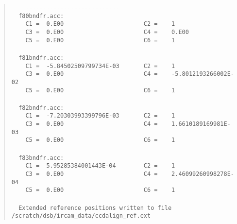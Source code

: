 \begin{quote}
\begin{tabbing}
\verb#    ---------------------------#\\
\verb#  f80bndfr.acc:#\\
\verb#    C1 =  0.E00                       C2 =    1#\\
\verb#    C3 =  0.E00                       C4 =    0.E00#\\
\verb#    C5 =  0.E00                       C6 =    1#\\
\verb##\\
\verb#  f81bndfr.acc:#\\
\verb#    C1 =  -5.84502509799734E-03       C2 =    1#\\
\verb#    C3 =  0.E00                       C4 =    -5.8012193266002E-02#\\
\verb#    C5 =  0.E00                       C6 =    1#\\
\verb##\\
\verb#  f82bndfr.acc:#\\
\verb#    C1 =  -7.20303993399796E-03       C2 =    1#\\
\verb#    C3 =  0.E00                       C4 =    1.6610189169981E-03#\\
\verb#    C5 =  0.E00                       C6 =    1#\\
\verb##\\
\verb#  f83bndfr.acc:#\\
\verb#    C1 =  5.95285384001443E-04        C2 =    1#\\
\verb#    C3 =  0.E00                       C4 =    2.46099260998278E-04#\\
\verb#    C5 =  0.E00                       C6 =    1#\\
\verb##\\
\verb#  Extended reference positions written to file#\\
\verb#/scratch/dsb/ircam_data/ccdalign_ref.ext#\\
\end{tabbing}
\end{quote}
\normalsize

\newpage

